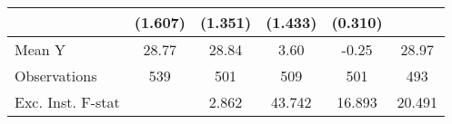 {\begin{tabular}{l*{5}{c}}
            &     (1.607)         &     (1.351)         &     (1.433)         &     (0.310)         &                     \\
\midrule
Mean Y      &       28.77         &       28.84         &        3.60         &       -0.25         &       28.97         \\
Observations&         539         &         501         &         509         &         501         &         493         \\
Exc. Inst. F-stat&                     &       2.862         &      43.742         &      16.893         &      20.491         \\
\bottomrule
\end{tabular}
}
